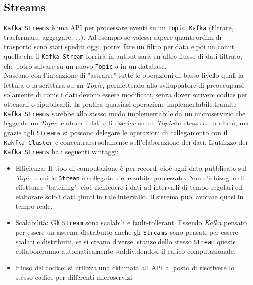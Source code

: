 \subsection{Streams}
\label{subsec:kafka_streams}
\texttt{Kafka Streams} è una API per processare eventi su un \texttt{Topic Kafka} (filtrare, trasformare, aggregare, ...).
Ad esempio se volessi sapere quanti ordini di trasporto sono stati spediti oggi, potrei fare un filtro per data e poi un count,
quello che il \texttt{Kafka Stream} fornirà in output sarà un altro flusso di dati filtrato, che potrò salvare su un nuovo \texttt{Topic} o in un database.\\
Nascono con l'intenzione di "astrarre" tutte le operazioni di basso livello quali la lettura o la scrittura su un \textit{Topic}, permettendo allo sviluppatore di preoccuparsi solamente di come i dati devono essere modificati, senza dover scrivere codice per ottenerli o ripublicarli.
In pratica qualsiasi operazione implementabile tramite \texttt{Kafka Streams} sarebbe allo stesso modo implementabile da un microservizio che legge da un \textit{Topic}, elabora i dati e li riscrive su un \textit{Topic}(lo stesso o un altro), ma grazie agli \texttt{Streams} si possono delegare le operazioni di collegamento con il \texttt{Kakfka Cluster} e concentrarsi solamente sull'elaborazione dei dati.
L'utilizzo dei \texttt{Kafka Streams} ha i seguenti vantaggi:
\begin{itemize}
    \item Efficienza: Il tipo di computazione è per-record, cioè ogni dato pubblicato sul \textit{Topic} a cui lo \texttt{Stream} è collegato viene subito processato. Non c'è bisogno di effettuare "batching", cioè richiedere i dati ad intervalli di tempo regolari ed elaborare solo i dati giunti in tale intervallo. Il sistema può lavorare quasi in tempo reale.  
    \item Scalabilità: Gli \texttt{Stream} sono scalabili e fault-tollerant. Essendo \textit{Kafka} pensato per essere un sistema distribuito anche gli \texttt{Streams} sono pensati per essere scalati e distribuiti, se si creano diverse istanze dello stesso \texttt{Stream} queste collaboreranno automaticamente suddividendosi il carico computazionale.
    \item Riuso del codice: si utilizza una chiamata all API al posto di riscrivere lo stesso codice per differenti microservizi.
\end{itemize}

